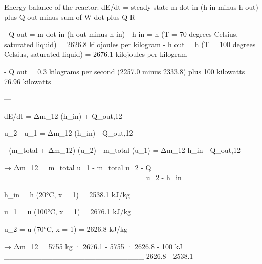 Energy balance of the reactor:  
dE/dt = steady state  
m dot in (h in minus h out) plus Q out minus sum of W dot plus Q R  

- Q out = m dot in (h out minus h in)  
- h in = h (T = 70 degrees Celsius, saturated liquid) = 2626.8 kilojoules per kilogram  
- h out = h (T = 100 degrees Celsius, saturated liquid) = 2676.1 kilojoules per kilogram  

- Q out = 0.3 kilograms per second (2257.0 minus 2333.8) plus 100 kilowatts = 76.96 kilowatts  

---

dE/dt = Δm_12 (h_in) + Q_out,12  

u_2 - u_1 = Δm_12 (h_in) - Q_out,12  

- (m_total + Δm_12) (u_2) - m_total (u_1) = Δm_12 h_in - Q_out,12  

→ Δm_12 = m_total u_1 - m_total u_2 - Q  
__________________________  
u_2 - h_in  

h_in = h (20°C, x = 1) = 2538.1 kJ/kg  

u_1 = u (100°C, x = 1) = 2676.1 kJ/kg  

u_2 = u (70°C, x = 1) = 2626.8 kJ/kg  

→ Δm_12 = 5755 kg · 2676.1 - 5755 · 2626.8 - 100 kJ  
__________________________  
2626.8 - 2538.1